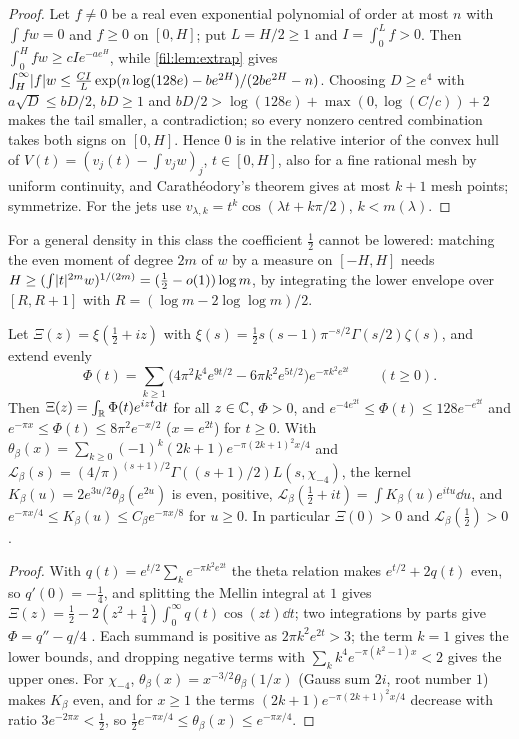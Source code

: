 \begin{proof}
Let $f\ne0$ be a real even exponential polynomial of order at most $n$ with $\int fw=0$ and $f\ge0$ on $[0,H]$;
put $L=H/2\ge1$ and $I=\int_0^Lf>0$. Then $\int_0^Hfw\ge cIe^{-ae^H}$, while \cref{fil:lem:extrap} gives
$\int_H^\infty\lvert f\rvert w\le\frac{CI}L\exp(n\log(128e)-be^{2H})/(2be^{2H}-n)$. Choosing $D\ge e^4$ with $a\sqrt D\le bD/2$,
$bD\ge1$ and $bD/2>\log(128e)+\max(0,\log(C/c))+2$ makes the tail smaller, a contradiction; so every nonzero
centred combination takes both signs on $[0,H]$. Hence $0$ is in the relative interior of the convex hull of
$V(t)=(v_j(t)-\int v_jw)_j$, $t\in[0,H]$, also for a fine rational mesh by uniform continuity, and
Carath\'eodory's theorem gives at most $k+1$ mesh points; symmetrize. For the jets use
$v_{\lambda,k}=t^k\cos(\lambda t+k\pi/2)$, $k<m(\lambda)$.
\end{proof}

For a general density in this class the coefficient $\tfrac12$ cannot be lowered: matching the even moment of
degree $2m$ of $w$ by a measure on $[-H,H]$ needs $H\ge(\int\lvert t\rvert^{2m}w)^{1/(2m)}=(\tfrac12-o(1))\log m$, by
integrating the lower envelope over $[R,R+1]$ with $R=(\log m-2\log\log m)/2$.

\begin{lemma}\label{fil:lem:kernels}
Let $\Xi(z)=\xi(\tfrac12+iz)$ with $\xi(s)=\tfrac12s(s-1)\pi^{-s/2}\Gamma(s/2)\zeta(s)$, and extend evenly
\[
 \Phi(t)=\sum_{k\ge1}\bigl(4\pi^2k^4e^{9t/2}-6\pi k^2e^{5t/2}\bigr)e^{-\pi k^2e^{2t}}\qquad(t\ge0).
\]
Then $\Xi(z)=\int_{\mathbb{R}}\Phi(t)e^{izt}\mathrm{d} t$ for all $z\in\mathbb{C}$, $\Phi>0$, and $e^{-4e^{2t}}\le\Phi(t)\le128e^{-e^{2t}}$ and
$e^{-\pi x}\le\Phi(t)\le8\pi^2e^{-x/2}$ ($x=e^{2t}$) for $t\ge0$. With
$\theta_\beta(x)=\sum_{k\ge0}(-1)^k(2k+1)e^{-\pi(2k+1)^2x/4}$ and
$\mathcal L_\beta(s)=(4/\pi)^{(s+1)/2}\Gamma((s+1)/2)L(s,\chi_{-4})$, the kernel
$K_\beta(u)=2e^{3u/2}\theta_\beta(e^{2u})$ is even, positive, $\mathcal L_\beta(\tfrac12+it)=\int K_\beta(u)e^{itu}\dd u$,
and $e^{-\pi x/4}\le K_\beta(u)\le C_\beta e^{-\pi x/8}$ for $u\ge0$. In particular $\Xi(0)>0$ and
$\mathcal L_\beta(\tfrac12)>0$.
\end{lemma}

\begin{proof}
With $q(t)=e^{t/2}\sum_ke^{-\pi k^2e^{2t}}$ the theta relation makes $e^{t/2}+2q(t)$ even, so $q'(0)=-\tfrac14$,
and splitting the Mellin integral at $1$ gives $\Xi(z)=\tfrac12-2(z^2+\tfrac14)\int_0^\infty q(t)\cos(zt)\dd t$;
two integrations by parts give $\Phi=q''-q/4$ \cite[\S2.16]{Titchmarsh1986Theory}. Each summand is positive as
$2\pi k^2e^{2t}>3$; the term $k=1$ gives the lower bounds, and dropping negative terms with
$\sum_kk^4e^{-\pi(k^2-1)x}<2$ gives the upper ones. For $\chi_{-4}$, $\theta_\beta(x)=x^{-3/2}\theta_\beta(1/x)$ (Gauss
sum $2i$, root number $1$) makes $K_\beta$ even, and for $x\ge1$ the terms $(2k+1)e^{-\pi(2k+1)^2x/4}$ decrease
with ratio $3e^{-2\pi x}<\tfrac12$, so $\tfrac12e^{-\pi x/4}\le\theta_\beta(x)\le e^{-\pi x/4}$.
\end{proof}

